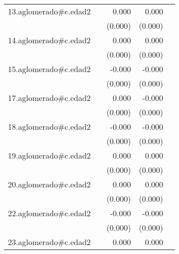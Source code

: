 {\begin{longtable}{l*{4}{D{.}{.}{-1}}}
\addlinespace
13.aglomerado#c.edad2&                     &       0.000         &       0.000         &                     \\
            &                     &     (0.000)         &     (0.000)         &                     \\
\addlinespace
14.aglomerado#c.edad2&                     &       0.000\sym{*}  &       0.000         &                     \\
            &                     &     (0.000)         &     (0.000)         &                     \\
\addlinespace
15.aglomerado#c.edad2&                     &      -0.000         &      -0.000\sym{*}  &                     \\
            &                     &     (0.000)         &     (0.000)         &                     \\
\addlinespace
17.aglomerado#c.edad2&                     &       0.000         &      -0.000         &                     \\
            &                     &     (0.000)         &     (0.000)         &                     \\
\addlinespace
18.aglomerado#c.edad2&                     &      -0.000         &      -0.000         &                     \\
            &                     &     (0.000)         &     (0.000)         &                     \\
\addlinespace
19.aglomerado#c.edad2&                     &       0.000         &       0.000         &                     \\
            &                     &     (0.000)         &     (0.000)         &                     \\
\addlinespace
20.aglomerado#c.edad2&                     &       0.000         &       0.000         &                     \\
            &                     &     (0.000)         &     (0.000)         &                     \\
\addlinespace
22.aglomerado#c.edad2&                     &      -0.000\sym{*}  &      -0.000\sym{***}&                     \\
            &                     &     (0.000)         &     (0.000)         &                     \\
\addlinespace
23.aglomerado#c.edad2&                     &       0.000\sym{**} &       0.000         &                     \\

\end{longtable}}
